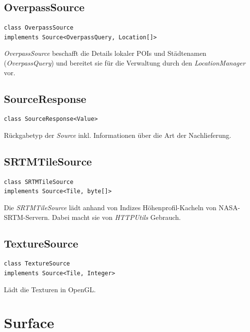 \documentclass[10pt]{scrreprt}
\begin{document}
\vspace{5mm}
\subsection*{OverpassSource}
\begin{lstlisting}
class OverpassSource
implements Source<OverpassQuery, Location[]>
\end{lstlisting}
\textit{OverpassSource} beschafft die Details lokaler POIs und Städtenamen (\textit{OverpassQuery}) und bereitet sie für die Verwaltung durch den \textit{LocationManager} vor.\\

\vspace{5mm}
\subsection*{SourceResponse}
\begin{lstlisting}
class SourceResponse<Value>
\end{lstlisting}
Rückgabetyp der \textit{Source} inkl. Informationen über die Art der Nachlieferung.\\

\vspace{5mm}
\subsection*{SRTMTileSource}
\begin{lstlisting}
class SRTMTileSource
implements Source<Tile, byte[]>
\end{lstlisting}
Die \textit{SRTMTileSource} lädt anhand von Indizes Höhenprofil-Kacheln von NASA-SRTM-Servern. Dabei macht sie von \textit{HTTPUtils} Gebrauch.\\

\vspace{5mm}
\subsection*{TextureSource}
\begin{lstlisting}
class TextureSource
implements Source<Tile, Integer>
\end{lstlisting}
Lädt die Texturen in OpenGL.\\



\vspace{5mm}
\section{Surface}
\end{document}
